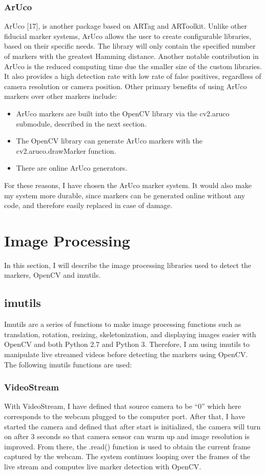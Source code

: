 \documentclass[oneside,%
                    author={Malak Hajji},
                    degree={BSc},
                    title={Designing An Accessible Computational Toolkit For Students},
                  subtitle={With Mixed Visual Abilities}]{dissertation}
\begin{document}
\subsubsection{ArUco}
ArUco [17], is another package based on ARTag and ARToolkit. Unlike other fiducial marker systems, ArUco allows the user to create configurable libraries, based on their specific needs. The library will only contain the specified number of markers with the greatest Hamming distance. Another notable contribution in ArUco is the reduced computing time due the smaller size of the custom libraries. It also provides a high detection rate with low rate of false positives, regardless of camera resolution or camera position. 
Other primary benefits of using ArUco markers over other markers include:

\begin{itemize}
  
\item ArUco markers are built into the OpenCV library via the cv2.aruco  submodule, described in the next section. 
\item	The OpenCV library can generate ArUco markers with the cv2.aruco.drawMarker
 function.
\item	There are online ArUco generators.

\end{itemize}
For these reasons, I have chosen the ArUco marker system. It would also make my system more durable, since markers can be generated online without any code, and therefore easily replaced in case of damage.

\section{Image Processing}
In this section, I will describe the image processing libraries used to detect the markers, OpenCV and imutils.

\subsection{imutils}

\noindent
Imutils are a series of functions to make image processing functions such as translation, rotation, resizing, skeletonization, and displaying images easier with OpenCV and both Python 2.7 and Python 3. Therefore, I am using imutils to manipulate live streamed videos before detecting the markers using OpenCV. The following imutils functions are used:

\subsubsection{VideoStream}
With VideoStream, I have defined that source camera to be “0” which here corresponds to the webcam plugged to the computer port. After that, I have started the camera and defined that after start is initialized, the camera will turn on after 3 seconds so that camera sensor can warm up and image resolution is improved. From there, the .read() function is used to obtain the current frame captured by the webcam. The system continues looping over the frames of the live stream and computes live marker detection with OpenCV.
\end{document}
